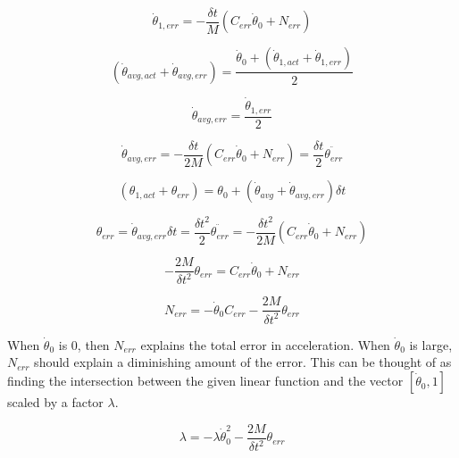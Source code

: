 \begin{equation}
\dot{\theta}_{1, err} = - \dfrac{\delta t}{M}(C_{err} \dot{\theta}_{0} + N_{err})
\end{equation}

\begin{equation}
(\dot{\theta}_{avg, act} + \dot{\theta}_{avg, err}) = \dfrac{\dot{\theta}_{0} + (\dot{\theta}_{1, act} + \dot{\theta}_{1, err})}{2}
\end{equation}

\begin{equation}
\dot{\theta}_{avg, err} = \dfrac{\dot{\theta}_{1, err}}{2}
\end{equation}

\begin{equation}
\dot{\theta}_{avg, err} = - \dfrac{\delta t}{2M}(C_{err} \dot{\theta}_{0} + N_{err}) = \dfrac{\delta t}{2} \ddot{\theta_{err}}
\end{equation}


\begin{equation}
(\theta_{1, act} + \theta_{err}) = \theta_{0} + (\dot{\theta}_{avg} + \dot{\theta}_{avg, err}) \delta t
\end{equation}

\begin{equation}
\theta_{err} = \dot{\theta}_{avg, err} \delta t = \dfrac{\delta t^{2}}{2} \ddot{\theta_{err}} = - \dfrac{\delta t^{2}}{2M}(C_{err} \dot{\theta}_{0} + N_{err})
\end{equation}

\begin{equation}
- \dfrac{2M}{\delta t^{2}} \theta_{err} = C_{err} \dot{\theta}_{0} + N_{err}
\end{equation}

\begin{equation}
N_{err} = 
- \dot{\theta}_{0} C_{err}
- \dfrac{2M}{\delta t^{2}} \theta_{err}
\end{equation}

When $\dot{\theta}_{0}$ is 0, then $N_{err}$ explains the total error in acceleration. When $\dot{\theta}_{0}$ is large, $N_{err}$ should explain a diminishing amount of the error. This can be thought of as finding the intersection between the given linear function and the vector $[\dot{\theta}_{0}, 1]$ scaled by a factor $\lambda$.

\begin{equation}
\lambda = 
- \lambda \dot{\theta}_{0}^{2}
- \dfrac{2M}{\delta t^{2}} \theta_{err}
\end{equation}

